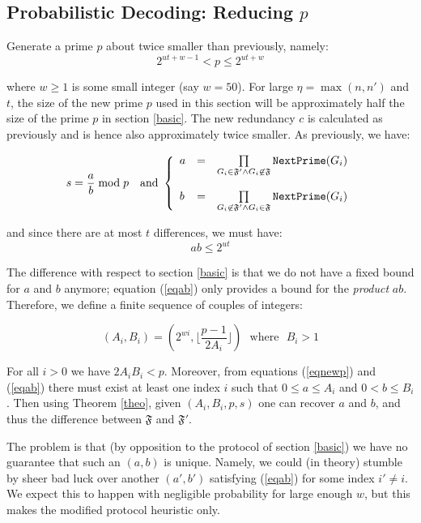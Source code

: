 \documentclass[11pt]{llncs}
\begin{document}
\subsection{Probabilistic Decoding: Reducing $p$}

Generate a prime $p$ about twice smaller than previously, namely:
\begin{equation}
\label{eqnewp}
2^{ut+w-1}<p \leq 2^{ut+w}
\end{equation}

where $w \geq 1$ is some small integer (say $w=50$). For large $\eta=\max(n,n')$ and $t$, the size of the new prime $p$ used in this section will be approximately half the size of the prime $p$ in section \ref{basic}. The new redundancy $c$ is calculated as previously and is hence also approximately twice smaller. As previously, we have:

$$
s=\frac{a}{b} \bmod p{~~~\mbox{and~}}
\left\{
\begin{array}{lcr}
a & =&  \prod\limits_{G_i \in \mathfrak{F}'\wedge G_i \not\in\mathfrak{F}} \mbox{{\tt NextPrime}}(G_i) \\
\\
b & = & \prod\limits_{G_i \not\in\mathfrak{F}' \wedge G_i \in\mathfrak{F}} \mbox{{\tt NextPrime}}(G_i)
\end{array}
\right.
$$

and since there are at most $t$ differences, we must have:
\begin{equation}
\label{eqab}
a b \leq 2^{ut}
\end{equation}

The difference with respect to section \ref{basic} is that we do not have a fixed bound for $a$ and $b$ anymore; equation (\ref{eqab}) only provides a bound for the {\sl product} $a b$. Therefore, we define a finite sequence of couples of integers:

$$(A_i,B_i)=(2^{wi},\lfloor \frac{p-1}{2 A_i} \rfloor)\mbox{~~where~~}B_i>1$$

For all $i>0$ we have $2 A_i B_i<p$. Moreover, from equations (\ref{eqnewp}) and (\ref{eqab}) there must exist at least one index $i$ such that $0 \leq a \leq A_i$ and $0 <b \leq B_i$. Then using Theorem \ref{theo}, given $(A_i,B_i,p,s)$ one can recover $a$ and $b$, and thus the difference between $\mathfrak{F}$ and $\mathfrak{F}'$.\smallskip

The problem is that (by opposition to the protocol of section \ref{basic}) we have no guarantee that such an $(a,b)$ is unique. Namely, we could (in theory) stumble by sheer bad luck over another $(a',b')$ satisfying (\ref{eqab}) for some index $i' \neq i$. We expect this to happen with negligible probability for large enough $w$, but this makes the modified protocol heuristic only.\smallskip
\end{document}

